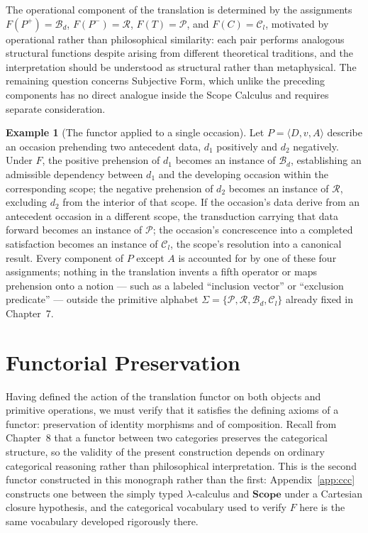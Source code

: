 \documentclass[11pt,twoside,openright]{book}
\numberwithin{equation}{chapter}
\theoremstyle{definition}
\newtheorem{example}[definition]{Example}
\theoremstyle{plain}
\theoremstyle{remark}
\theoremstyle{definition}
\newcommand{\CatScope}{\mathbf{Scope}}
\newcommand{\Alphabet}{\Sigma}
\newcommand{\Pop}{\mathcal{P}}
\newcommand{\Refuse}{\mathcal{R}}
\newcommand{\Bind}{\mathcal{B}_d}
\newcommand{\Collapse}{\mathcal{C}_l}
\newcommand{\ScopeAlphabet}{\Alphabet=\{\Pop,\Refuse,\Bind,\Collapse\}}
\newcommand{\WData}{D}
\newcommand{\WPrehensions}{P}
\newcommand{\WValuation}{v}
\newcommand{\WSubjForm}{A}
\begin{document}
The operational component of the translation is determined by the
assignments $F(P^{+})=\Bind$, $F(P^{-})=\Refuse$, $F(T)=\Pop$, and
$F(C)=\Collapse$, motivated by operational rather than philosophical
similarity: each pair performs analogous structural functions despite
arising from different theoretical traditions, and the interpretation
should be understood as structural rather than metaphysical. The
remaining question concerns Subjective Form, which unlike the preceding
components has no direct analogue inside the Scope Calculus and requires
separate consideration.

\begin{example}[The functor applied to a single occasion]
Let $\WPrehensions=\langle\WData,\WValuation,\WSubjForm\rangle$ describe an
occasion prehending two antecedent data, $d_1$ positively and $d_2$
negatively. Under $F$, the positive prehension of $d_1$ becomes an
instance of $\Bind$, establishing an admissible dependency between $d_1$
and the developing occasion within the corresponding scope; the negative
prehension of $d_2$ becomes an instance of $\Refuse$, excluding $d_2$
from the interior of that scope. If the occasion's data derive from an
antecedent occasion in a different scope, the transduction carrying that
data forward becomes an instance of $\Pop$; the occasion's concrescence
into a completed satisfaction becomes an instance of $\Collapse$, the
scope's resolution into a canonical result. Every component of
$\WPrehensions$ except $\WSubjForm$ is accounted for by one of these four
assignments; nothing in the translation invents a fifth operator or maps
prehension onto a notion --- such as a labeled ``inclusion vector'' or
``exclusion predicate'' --- outside the primitive alphabet
$\ScopeAlphabet$ already fixed in Chapter~7.
\end{example}

\section{Functorial Preservation}

Having defined the action of the translation functor on both objects and
primitive operations, we must verify that it satisfies the defining
axioms of a functor: preservation of identity morphisms and of
composition. Recall from Chapter~8 that a functor between two categories
preserves the categorical structure, so the validity of the present
construction depends on ordinary categorical reasoning
\cite{MacLane1998,Awodey2010} rather than philosophical interpretation.
This is the second functor constructed in this monograph rather than the
first: Appendix~\ref{app:ccc} constructs one between the simply typed
$\lambda$-calculus and $\CatScope$ under a Cartesian closure hypothesis,
and the categorical vocabulary used to verify $F$ here is the same
vocabulary developed rigorously there.
\end{document}

